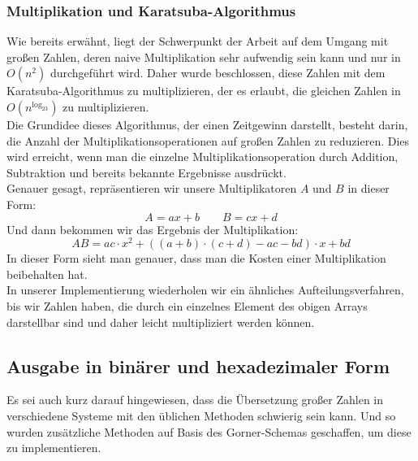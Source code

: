 \documentclass[course=erap]{aspdoc}
\begin{document}
\subsubsection{Multiplikation und Karatsuba-Algorithmus}%
Wie bereits erwähnt, liegt der Schwerpunkt der Arbeit auf dem Umgang mit großen Zahlen, deren naive Multiplikation sehr aufwendig sein kann und nur in $O(n^2)$ durchgeführt wird. Daher wurde beschlossen, diese Zahlen mit dem Karatsuba-Algorithmus   \cite{Karatsuba} zu multiplizieren, der es erlaubt, die gleichen Zahlen in $O(n^{\log_23})$ zu multiplizieren. \\
Die Grundidee dieses Algorithmus, der einen Zeitgewinn darstellt, besteht darin, die Anzahl der Multiplikationsoperationen auf großen Zahlen zu reduzieren. Dies wird erreicht, wenn man die einzelne Multiplikationsoperation durch Addition, Subtraktion und bereits bekannte Ergebnisse ausdrückt. \\
Genauer gesagt, repräsentieren wir unsere Multiplikatoren $A$ und $B$ in dieser Form:
\begin{equation*}
A = ax + b \qquad B = cx + d 
\end{equation*} 
Und dann bekommen wir das Ergebnis der Multiplikation:
\begin{equation}\label{eq:karatsuba}
AB = ac\cdot x^2 + ((a + b)\cdot(c + d) - ac - bd)\cdot x + bd
\end{equation}
In dieser Form sieht man genauer, dass man die Kosten einer Multiplikation beibehalten hat.\\
In unserer Implementierung wiederholen wir ein ähnliches Aufteilungsverfahren, bis wir Zahlen haben, die durch ein einzelnes Element des obigen Arrays darstellbar sind und daher leicht multipliziert werden können.
\subsection{Ausgabe in binärer und hexadezimaler Form }%
Es sei auch kurz darauf hingewiesen, dass die Übersetzung großer Zahlen in verschiedene Systeme mit den üblichen Methoden schwierig sein kann. Und so wurden zusätzliche Methoden auf Basis des Gorner-Schemas \cite{Gorner} geschaffen, um diese zu implementieren.
\end{document}

